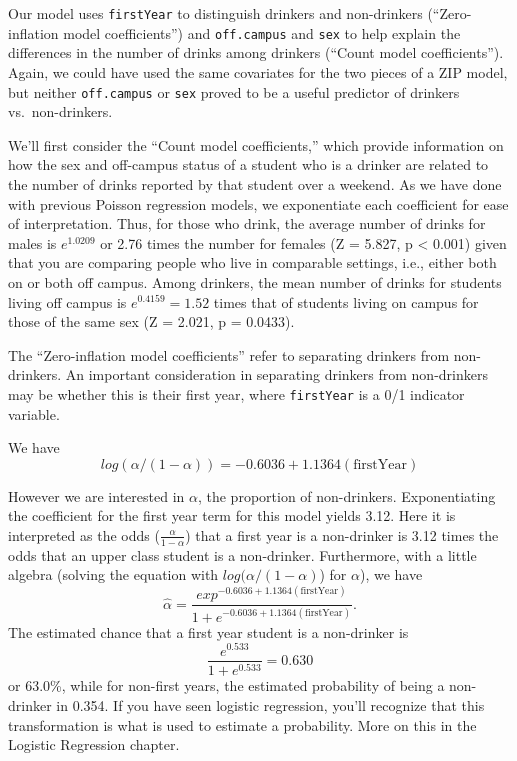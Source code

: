 \documentclass[
]{krantz}
\begin{document}
Our model uses \texttt{firstYear} to distinguish drinkers and non-drinkers (``Zero-inflation model coefficients'') and \texttt{off.campus} and \texttt{sex} to help explain the differences in the number of drinks among drinkers (``Count model coefficients''). Again, we could have used the same covariates for the two pieces of a ZIP model, but neither \texttt{off.campus} or \texttt{sex} proved to be a useful predictor of drinkers vs.~non-drinkers.

We'll first consider the ``Count model coefficients,'' which provide information on how the sex and off-campus status of a student who is a drinker are related to the number of drinks reported by that student over a weekend. As we have done with previous Poisson regression models, we exponentiate each coefficient for ease of interpretation. Thus, for those who drink, the average number of drinks for males is \(e^{1.0209}\) or 2.76 times the number for females (Z = 5.827, p \textless{} 0.001) given that you are comparing people who live in comparable settings, i.e., either both on or both off campus. Among drinkers, the mean number of drinks for students living off campus is \(e^{0.4159}=1.52\) times that of students living on campus for those of the same sex (Z = 2.021, p = 0.0433).

The ``Zero-inflation model coefficients'' refer to separating drinkers from non-drinkers. An important consideration in separating drinkers from non-drinkers may be whether this is their first year, where \texttt{firstYear} is a 0/1 indicator variable.

We have
\[ 
log(\alpha/(1-\alpha)) =-0.6036+1.1364(\textrm{firstYear})
 \]

However we are interested in \(\alpha\), the proportion of non-drinkers. Exponentiating the coefficient for the first year term for this model yields 3.12. Here it is interpreted as the odds (\(\frac{\alpha}{1-\alpha}\)) that a first year is a non-drinker is 3.12 times the odds that an upper class student is a non-drinker. Furthermore, with a little algebra (solving the equation with \(log(\alpha/(1-\alpha)\)) for \(\alpha\)),
we have
\[
 \hat{\alpha} =
 \frac{exp^ {-0.6036+1.1364(\textrm{firstYear})}}
 {1+e^{
 -0.6036+1.1364(\textrm{firstYear})
 }
 }.
 \]
The estimated chance that a first year student is a non-drinker is
\[
\frac{e^{0.533}}{1+e^{0.533}} = 0.630
\]
or 63.0\%, while for non-first years, the estimated probability of being a non-drinker in 0.354. If you have seen logistic regression, you'll recognize that this transformation is what is used to estimate a probability. More on this in the Logistic Regression chapter.
\end{document}
